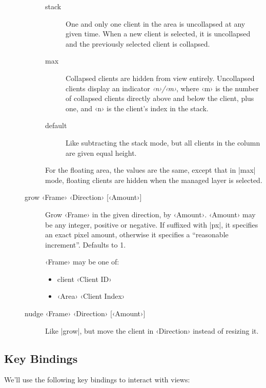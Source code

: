 \begin{description}
\begin{description}
        \begin{description}
          \item[stack] One and only one client in the area is
            uncollapsed at any given time. When a new client is
            selected, it is uncollapsed and the previously selected
            client is collapsed.
          \item[max] Collapsed clients are hidden from view
            entirely. Uncollapsed clients display an indicator
            {\it‹n›/‹m›}, where ‹m› is the number of collapsed
            clients directly above and below the client, plus one,
            and ‹n› is the client's index in the stack.
          \item[default] Like subtracting the stack mode, but all
            clients in the column are given equal height.
        \end{description}

        For the floating area, the values are the same, except that
        in |max| mode, floating clients are hidden when the managed
        layer is selected.
      \item[grow ‹Frame› ‹Direction› {[‹Amount›]}] Grow ‹Frame› in
        the given direction, by ‹Amount›. ‹Amount› may be any
        integer, positive or negative. If suffixed with |px|,
        it specifies an exact pixel amount, otherwise it specifies a
        “reasonable increment”. Defaults to 1.

        ‹Frame› may be one of:
        \begin{itemize}
          \item client ‹Client ID›
          \item ‹Area› ‹Client Index›
        \end{itemize}
      \item[nudge ‹Frame› ‹Direction› {[‹Amount›]}] Like
        |grow|, but move the client in ‹Direction› instead of
        resizing it.
  \end{description}
\end{description}


\subsection{Key Bindings}

We'll use the following key bindings to interact with views:

